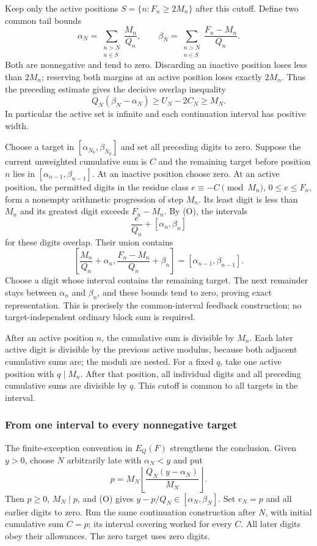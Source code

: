\documentclass[11pt]{article}
\begin{document}
Keep only the active positions $S=\{n:F_n\ge2M_n\}$ after this cutoff.
Define two common tail bounds
\[
 \alpha_N=\sum_{\substack{n>N\\n\in S}}\frac{M_n}{Q_n},\qquad
 \beta_N=\sum_{\substack{n>N\\n\in S}}\frac{F_n-M_n}{Q_n}.
\]
Both are nonnegative and tend to zero. Discarding an inactive position loses
less than $2M_n$; reserving both margins at an active position loses exactly
$2M_n$. Thus the preceding estimate gives the decisive overlap inequality
\[
 Q_N(\beta_N-\alpha_N)\ge U_N-2C_N\ge M_N.
 \tag{O}\label{capacity:eq:overlap}
\]
In particular the active set is infinite and each continuation interval
has positive width.

Choose a target in $[\alpha_{N_0},\beta_{N_0}]$ and set all preceding digits
to zero. Suppose the current unweighted cumulative sum is $C$ and the
remaining target before position $n$ lies in
$[\alpha_{n-1},\beta_{n-1}]$. At an inactive position choose zero.
At an active position, the permitted digits in the residue class
$e\equiv-C\pmod{M_n}$, $0\le e\le F_n$, form a nonempty arithmetic
progression of step $M_n$. Its least digit is less than $M_n$ and its
greatest digit exceeds $F_n-M_n$. By (O), the intervals
\[
 \frac e{Q_n}+[\alpha_n,\beta_n]
\]
for these digits overlap. Their union contains
\[
 \left[\frac{M_n}{Q_n}+\alpha_n,
       \frac{F_n-M_n}{Q_n}+\beta_n\right]
   =[\alpha_{n-1},\beta_{n-1}].
\]
Choose a digit whose interval contains the remaining target. The next
remainder stays between $\alpha_n$ and $\beta_n$, and these bounds tend to
zero, proving exact representation. This is precisely the common-interval
feedback construction; no target-independent ordinary block sum is required.

After an active position $n$, the cumulative sum is divisible by $M_n$.
Each later active digit is divisible by the previous active modulus,
because both adjacent cumulative sums are; the moduli are nested.
For a fixed $q$, take one active position with $q\mid M_n$. After that
position, all individual digits and all preceding cumulative sums are
divisible by $q$. This cutoff is common to all targets in the interval.

\subsubsection{From one interval to every nonnegative target}
The finite-exception convention in $E_Q(F)$ strengthens the conclusion.
Given $y>0$, choose $N$ arbitrarily late with $\alpha_N<y$ and put
\[
 p=M_N\left\lfloor\frac{Q_N(y-\alpha_N)}{M_N}\right\rfloor.
\]
Then $p\ge0$, $M_N\mid p$, and (O) gives
$y-p/Q_N\in[\alpha_N,\beta_N]$. Set $e_N=p$ and all earlier digits to
zero. Run the same continuation construction after $N$, with initial
cumulative sum $C=p$; its interval covering worked for every $C$.
All later digits obey their allowances. The zero target uses zero digits.
\end{document}
